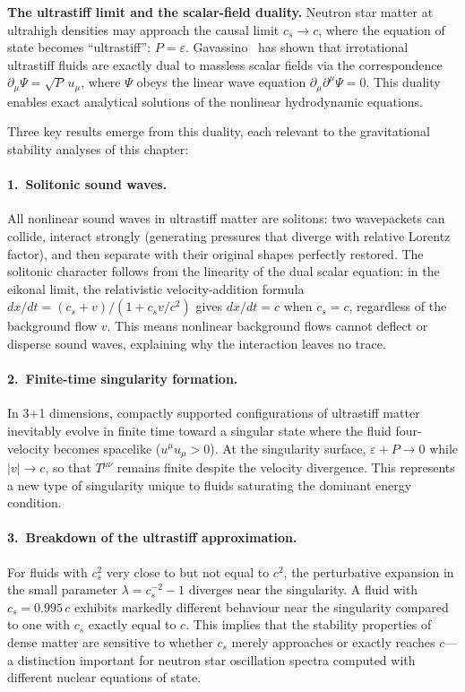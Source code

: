 \begin{relcorrection}
\textbf{The ultrastiff limit and the scalar-field duality.}
Neutron star matter at ultrahigh densities may approach the causal
limit $c_s \to c$, where the equation of state becomes ``ultrastiff'':
$P = \varepsilon$.  Gavassino~\cite{GavassinoSolitonsUltrastiff2025}
has shown that irrotational ultrastiff fluids are exactly dual to
massless scalar fields via the correspondence
$\partial_\mu\Psi = \sqrt{P}\,u_\mu$, where $\Psi$ obeys the linear
wave equation $\partial_\mu\partial^\mu\Psi = 0$.  This duality
enables exact analytical solutions of the nonlinear hydrodynamic
equations.

Three key results emerge from this duality, each relevant to the
gravitational stability analyses of this chapter:

\paragraph{1.~Solitonic sound waves.}
All nonlinear sound waves in ultrastiff matter are solitons: two
wavepackets can collide, interact strongly (generating pressures that
diverge with relative Lorentz factor), and then separate with their
original shapes perfectly restored.  The solitonic character follows
from the linearity of the dual scalar equation: in the eikonal limit,
the relativistic velocity-addition formula $dx/dt = (c_s + v)/(1 + c_s
v/c^2)$ gives $dx/dt = c$ when $c_s = c$, regardless of the background
flow $v$.  This means nonlinear background flows cannot deflect or
disperse sound waves, explaining why the interaction leaves no trace.

\paragraph{2.~Finite-time singularity formation.}
In 3+1 dimensions, compactly supported configurations of ultrastiff
matter inevitably evolve in finite time toward a singular state where
the fluid four-velocity becomes spacelike ($u^\mu u_\mu > 0$).  At
the singularity surface, $\varepsilon + P \to 0$ while $|v| \to c$,
so that $T^{\mu\nu}$ remains finite despite the velocity divergence.
This represents a new type of singularity unique to fluids saturating
the dominant energy condition.

\paragraph{3.~Breakdown of the ultrastiff approximation.}
For fluids with $c_s^2$ very close to but not equal to $c^2$, the
perturbative expansion in the small parameter $\lambda = c_s^{-2} - 1$
diverges near the singularity.  A fluid with $c_s = 0.995\,c$ exhibits
markedly different behaviour near the singularity compared to one with
$c_s$ exactly equal to $c$.  This implies that the stability properties
of dense matter are sensitive to whether $c_s$ merely approaches or
exactly reaches $c$---a distinction important for neutron star
oscillation spectra computed with different nuclear equations of state.


\end{relcorrection}
